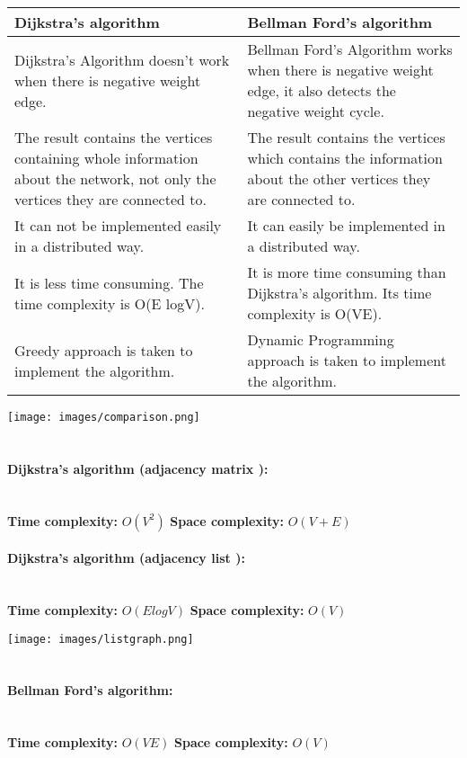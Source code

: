 \documentclass[10pt]{article}
\begin{document}
\begin{multicols*}{2}
 \begin{tabular}{| p{4cm} | p{4cm} |} 
 \hline
 Dijkstra's algorithm & Bellman Ford's algorithm \\ [0.5ex] 
 \hline\hline
 Dijkstra’s Algorithm doesn’t work when there is negative weight edge. & Bellman Ford’s Algorithm works when there is negative weight edge,
it also detects the negative  weight cycle.
 \\ 
 \hline
 The result contains the vertices containing whole information about the network, not only the
vertices they are connected to.
 & The result contains the vertices which contains the information  about the other  vertices they are connected to. \\
 \hline
It can not be implemented easily in
a distributed way.
 & It can easily be implemented in a
distributed way.
 \\
 \hline
 It is less time consuming. The time complexity is O(E logV). & It is more time consuming than Dijkstra’s algorithm. Its time complexity is O(VE). \\
 \hline
Greedy approach is taken to implement the algorithm. & Dynamic Programming approach is taken to
implement the algorithm.
 \\ [1ex] 
 \hline
\end{tabular}

\texttt{[image: images/comparison.png]}\\\\


\paragraph{Dijkstra's algorithm (adjacency matrix ):} \\
\textbf{Time complexity: } \(O(V^2)\)
\textbf{Space complexity: } \(O(V+E)\)


\paragraph{Dijkstra's algorithm (adjacency list ):} \\
\textbf{Time complexity: } \(O(ElogV)\)
\textbf{Space complexity: } \(O(V)\)

\texttt{[image: images/listgraph.png]}\\\\


\paragraph{Bellman Ford's algorithm:} \\
\textbf{Time complexity: } \(O(VE)\)
\textbf{Space complexity: } \(O(V)\)


\end{multicols*}
\end{document}
